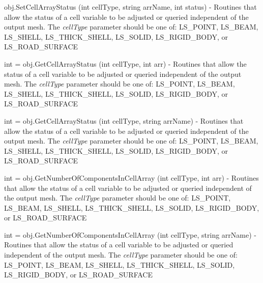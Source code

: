 \begin{DoxyItemize}
\item {\ttfamily obj.\-Set\-Cell\-Array\-Status (int cell\-Type, string arr\-Name, int status)} -\/ Routines that allow the status of a cell variable to be adjusted or queried independent of the output mesh. The {\itshape cell\-Type} parameter should be one of\-: L\-S\-\_\-\-P\-O\-I\-N\-T, L\-S\-\_\-\-B\-E\-A\-M, L\-S\-\_\-\-S\-H\-E\-L\-L, L\-S\-\_\-\-T\-H\-I\-C\-K\-\_\-\-S\-H\-E\-L\-L, L\-S\-\_\-\-S\-O\-L\-I\-D, L\-S\-\_\-\-R\-I\-G\-I\-D\-\_\-\-B\-O\-D\-Y, or L\-S\-\_\-\-R\-O\-A\-D\-\_\-\-S\-U\-R\-F\-A\-C\-E  
\item {\ttfamily int = obj.\-Get\-Cell\-Array\-Status (int cell\-Type, int arr)} -\/ Routines that allow the status of a cell variable to be adjusted or queried independent of the output mesh. The {\itshape cell\-Type} parameter should be one of\-: L\-S\-\_\-\-P\-O\-I\-N\-T, L\-S\-\_\-\-B\-E\-A\-M, L\-S\-\_\-\-S\-H\-E\-L\-L, L\-S\-\_\-\-T\-H\-I\-C\-K\-\_\-\-S\-H\-E\-L\-L, L\-S\-\_\-\-S\-O\-L\-I\-D, L\-S\-\_\-\-R\-I\-G\-I\-D\-\_\-\-B\-O\-D\-Y, or L\-S\-\_\-\-R\-O\-A\-D\-\_\-\-S\-U\-R\-F\-A\-C\-E  
\item {\ttfamily int = obj.\-Get\-Cell\-Array\-Status (int cell\-Type, string arr\-Name)} -\/ Routines that allow the status of a cell variable to be adjusted or queried independent of the output mesh. The {\itshape cell\-Type} parameter should be one of\-: L\-S\-\_\-\-P\-O\-I\-N\-T, L\-S\-\_\-\-B\-E\-A\-M, L\-S\-\_\-\-S\-H\-E\-L\-L, L\-S\-\_\-\-T\-H\-I\-C\-K\-\_\-\-S\-H\-E\-L\-L, L\-S\-\_\-\-S\-O\-L\-I\-D, L\-S\-\_\-\-R\-I\-G\-I\-D\-\_\-\-B\-O\-D\-Y, or L\-S\-\_\-\-R\-O\-A\-D\-\_\-\-S\-U\-R\-F\-A\-C\-E  
\item {\ttfamily int = obj.\-Get\-Number\-Of\-Components\-In\-Cell\-Array (int cell\-Type, int arr)} -\/ Routines that allow the status of a cell variable to be adjusted or queried independent of the output mesh. The {\itshape cell\-Type} parameter should be one of\-: L\-S\-\_\-\-P\-O\-I\-N\-T, L\-S\-\_\-\-B\-E\-A\-M, L\-S\-\_\-\-S\-H\-E\-L\-L, L\-S\-\_\-\-T\-H\-I\-C\-K\-\_\-\-S\-H\-E\-L\-L, L\-S\-\_\-\-S\-O\-L\-I\-D, L\-S\-\_\-\-R\-I\-G\-I\-D\-\_\-\-B\-O\-D\-Y, or L\-S\-\_\-\-R\-O\-A\-D\-\_\-\-S\-U\-R\-F\-A\-C\-E  
\item {\ttfamily int = obj.\-Get\-Number\-Of\-Components\-In\-Cell\-Array (int cell\-Type, string arr\-Name)} -\/ Routines that allow the status of a cell variable to be adjusted or queried independent of the output mesh. The {\itshape cell\-Type} parameter should be one of\-: L\-S\-\_\-\-P\-O\-I\-N\-T, L\-S\-\_\-\-B\-E\-A\-M, L\-S\-\_\-\-S\-H\-E\-L\-L, L\-S\-\_\-\-T\-H\-I\-C\-K\-\_\-\-S\-H\-E\-L\-L, L\-S\-\_\-\-S\-O\-L\-I\-D, L\-S\-\_\-\-R\-I\-G\-I\-D\-\_\-\-B\-O\-D\-Y, or L\-S\-\_\-\-R\-O\-A\-D\-\_\-\-S\-U\-R\-F\-A\-C\-E  

\end{DoxyItemize}
